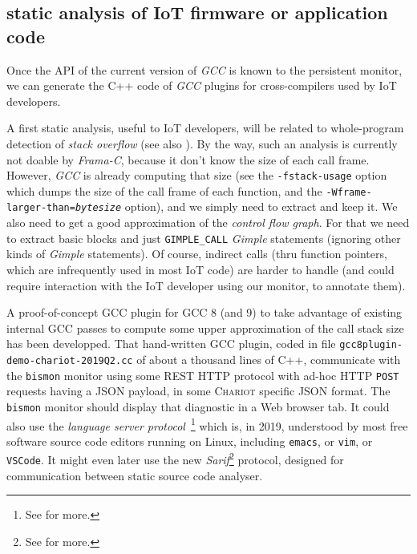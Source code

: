 \subsection{static analysis of IoT firmware or application code}
\label{subsec:analysiot}

Once the API of the current version of \emph{GCC} is known to the
persistent monitor, we can generate the C++ code of \emph{GCC} plugins
for cross-compilers used by IoT developers.

A first static analysis, useful to IoT developers, will be related to
whole-program detection of \emph{stack overflow}  (see also \cite{Payer:2018:MSV}). By the way, such an
analysis is currently not doable by \emph{Frama-C}, because it don't
know the size of each call frame. However, \emph{GCC} is already
computing that size (see the \texttt{-fstack-usage} option which dumps
the size of the call frame of each function, and the
\texttt{-Wframe-larger-than=\emph{bytesize}} option), and we simply
need to extract and keep it. We also need to get a good approximation
of the \emph{control flow graph}. For that
we need to extract basic blocks and just \texttt{GIMPLE\_CALL}
\emph{Gimple} statements (ignoring other kinds of \emph{Gimple}
statements). Of course, indirect calls (thru function pointers, which
are infrequently used in most IoT code) are harder to handle (and
could require interaction with the IoT developer using our monitor, to
annotate them).

A proof-of-concept GCC plugin for GCC 8 (and 9) to take advantage of
existing internal GCC passes to compute some upper approximation of
the call stack size has been developped. That hand-written GCC plugin,
coded in file \texttt{gcc8plugin-demo-chariot-2019Q2.cc} of about a
thousand lines of C++, communicate with the \texttt{bismon} monitor
using some REST HTTP protocol with ad-hoc HTTP \texttt{POST} requests
having a JSON payload, in some \textsc{Chariot} specific JSON
format. The \texttt{bismon} monitor should display that diagnostic in
a Web browser tab. It could also use the \emph{language server
  protocol}~\footnote{See  for more.}
which is, in 2019, understood by most free software source code
editors running on Linux, including \texttt{emacs}, or \texttt{vim},
or \texttt{VSCode}. It might even later use the new
\emph{Sarif}\footnote{See
  for more.}  protocol, designed for communication between static
source code analyser.

